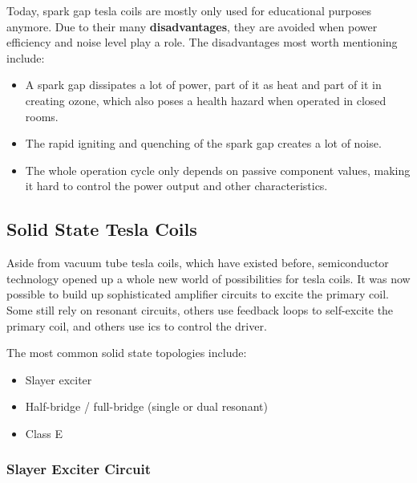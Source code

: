 Today, spark gap tesla coils are mostly only used for educational purposes anymore. Due to their many \textbf{disadvantages}, they are avoided when power efficiency and noise level play a role. The disadvantages most worth mentioning include:

\begin{itemize}
\item A spark gap dissipates a lot of power, part of it as heat and part of it in creating ozone, which also poses a health hazard when operated in closed rooms.
\item The rapid igniting and quenching of the spark gap creates a lot of noise.
\item The whole operation cycle only depends on passive component values, making it hard to control the power output and other characteristics.
\end{itemize}

\subsection{Solid State Tesla Coils}

Aside from vacuum tube tesla coils, which have existed before, semiconductor technology opened up a whole new world of possibilities for tesla coils. It was now possible to build up sophisticated amplifier circuits to excite the primary coil. Some still rely on resonant circuits, others use feedback loops to self-excite the primary coil, and others use \glspl{ic} to control the driver.

The most common solid state topologies include:
\begin{itemize}
\item Slayer exciter
\item Half-bridge / full-bridge (single or dual resonant)
\item Class E
\end{itemize}

\subsubsection{Slayer Exciter Circuit}

